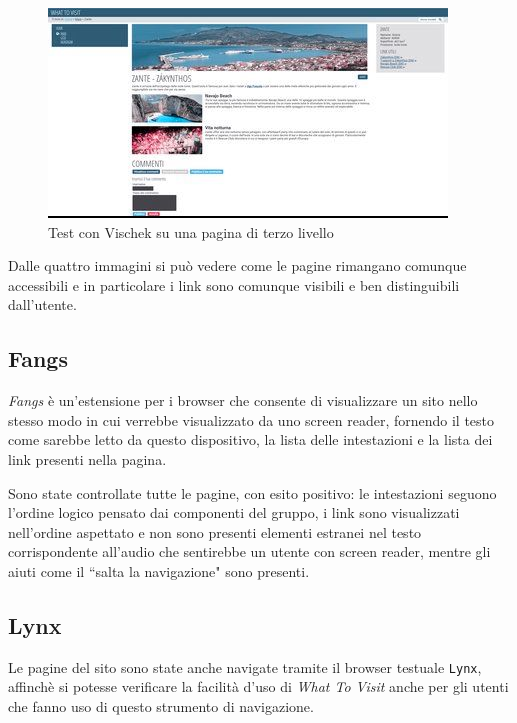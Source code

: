 \begin{figure}[H]
\begin{minipage}{0.45\textwidth}
\end{minipage}
\hspace{\fill}
\begin{minipage}{0.45\textwidth}
\includegraphics[width=\linewidth]{images/screen/tritanope.jpg}
\end{minipage}
\caption{Test con Vischek su una pagina di terzo livello}\label{multiavp}
\end{figure}

Dalle quattro immagini si può vedere come le pagine rimangano comunque accessibili e
in particolare i link sono comunque visibili e ben distinguibili dall'utente.

\subsection{Fangs}\label{sec:fangs}
\textit{Fangs} è un'estensione per i browser che consente di visualizzare un
sito nello stesso modo in cui verrebbe visualizzato da uno screen reader,
fornendo il testo come sarebbe letto da questo dispositivo, la lista delle
intestazioni e la lista dei link presenti nella pagina.

Sono state controllate tutte le pagine, con esito positivo: le intestazioni
seguono l'ordine logico pensato dai componenti del gruppo, i link sono
visualizzati nell'ordine aspettato e non sono presenti elementi estranei nel
testo corrispondente all'audio che sentirebbe un utente con screen reader,
mentre gli aiuti come il ``salta la navigazione" sono presenti.

\subsection{Lynx}\label{sec:lynx}
Le pagine del sito sono state anche navigate tramite il browser testuale
\texttt{Lynx}, affinchè si potesse verificare la facilità d'uso di
\textit{What To Visit} anche per gli utenti che fanno uso di questo
strumento di navigazione.

